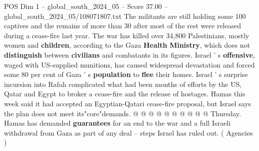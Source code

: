 \begin{textsample}{POS Dim 1 – global\_south\_2024\_05 – Score 37.00 – global\_south\_2024\_05/108071807.txt}
The militants are still holding some 100 captives and the remains of more than 30 after most of the rest were released during a cease-fire last year.
The war has killed over 34,800 Palestinians, mostly women and \textbf{children}, according to the Gaza \textbf{Health} \textbf{Ministry}, which does not \textbf{distinguish} between \textbf{civilians} and combatants in its figures.
Israel ' s \textbf{offensive}, waged with US-supplied munitions, has caused widespread devastation and forced some 80 per cent of Gaza ' s \textbf{population} to \textbf{flee} their homes.
Israel ' s surprise incursion into Rafah complicated what had been months of efforts by the US, Qatar and Egypt to broker a cease-fire and the release of hostages.
Hamas this week said it had accepted an Egyptian-Qatari cease-fire proposal, but Israel says the plan does not meet its"core"demands. @ @ @ @ @ @ @ @ @ @ Thursday.
Hamas has demanded \textbf{guarantees} for an end to the war and a full Israeli withdrawal from Gaza as part of any deal -- steps Israel has ruled out. ( Agencies )

\end{textsample}
